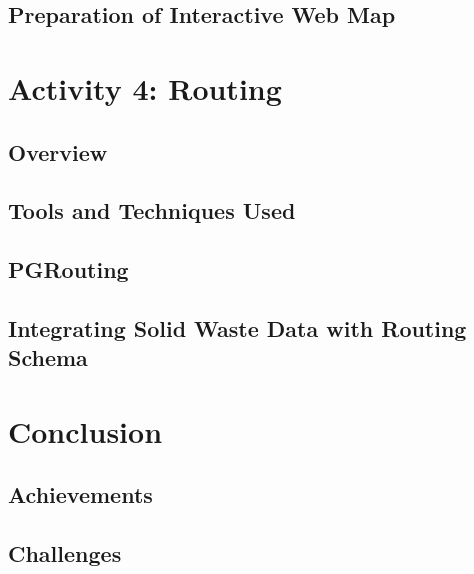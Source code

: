 \documentclass[a4paper,12pt,twoside]{article}
\begin{document}
\subsection{Preparation of Interactive Web Map}

    \begin{multicols}{2}
    \lipsum[0-5]
    \end{multicols}

\section{Activity 4: Routing}

\subsection{Overview}

\subsection{Tools and Techniques Used}

\subsection{PGRouting}

\subsection{Integrating Solid Waste Data with Routing Schema}

\section{Conclusion}

    \begin{multicols}{2}
    \lipsum[0-5]
    \end{multicols}

\subsection{Achievements}

    \begin{multicols}{2}
    \lipsum[0-5]
    \end{multicols}

\subsection{Challenges}
\end{document}
